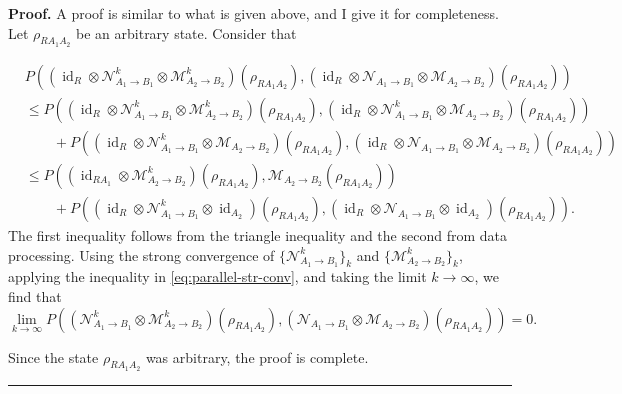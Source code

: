 \documentclass[apsrev,twocolumn]{revtex4-1}%
\newenvironment{proof}[1][Proof]{\noindent\textbf{#1.} }{\ \rule{0.5em}{0.5em}}
\begin{document}
\begin{proof}
A proof is similar to what is given above, and I give it for completeness. Let
$\rho_{RA_{1}A_{2}}$ be an arbitrary state. Consider that\begin{widetext}%
\begin{align}
& \!\!\!\!\!\!\!\! P((\operatorname{id}_{R}\otimes\mathcal{N}_{A_{1}\rightarrow B_{1}}%
^{k}\otimes\mathcal{M}_{A_{2}\rightarrow B_{2}}^{k})(\rho_{RA_{1}A_{2}%
}),(\operatorname{id}_{R}\otimes\mathcal{N}_{A_{1}\rightarrow B_{1}}%
\otimes\mathcal{M}_{A_{2}\rightarrow B_{2}})(\rho_{RA_{1}A_{2}}))\nonumber\\
&  \leq P((\operatorname{id}_{R}\otimes\mathcal{N}_{A_{1}\rightarrow B_{1}%
}^{k}\otimes\mathcal{M}_{A_{2}\rightarrow B_{2}}^{k})(\rho_{RA_{1}A_{2}%
}),(\operatorname{id}_{R}\otimes\mathcal{N}_{A_{1}\rightarrow B_{1}}%
^{k}\otimes\mathcal{M}_{A_{2}\rightarrow B_{2}})(\rho_{RA_{1}A_{2}%
}))\nonumber\\
&  \qquad+P((\operatorname{id}_{R}\otimes\mathcal{N}_{A_{1}\rightarrow B_{1}%
}^{k}\otimes\mathcal{M}_{A_{2}\rightarrow B_{2}})(\rho_{RA_{1}A_{2}%
}),(\operatorname{id}_{R}\otimes\mathcal{N}_{A_{1}\rightarrow B_{1}}%
\otimes\mathcal{M}_{A_{2}\rightarrow B_{2}})(\rho_{RA_{1}A_{2}}))\nonumber\\
&  \leq P((\operatorname{id}_{RA_{1}}\otimes\mathcal{M}_{A_{2}\rightarrow
B_{2}}^{k})(\rho_{RA_{1}A_{2}}),\mathcal{M}_{A_{2}\rightarrow B_{2}}%
(\rho_{RA_{1}A_{2}}))\nonumber\\
&  \qquad+P((\operatorname{id}_{R}\otimes\mathcal{N}_{A_{1}\rightarrow B_{1}%
}^{k}\otimes\operatorname{id}_{A_{2}})(\rho_{RA_{1}A_{2}}),(\operatorname{id}%
_{R}\otimes\mathcal{N}_{A_{1}\rightarrow B_{1}}\otimes\operatorname{id}%
_{A_{2}})(\rho_{RA_{1}A_{2}})).\label{eq:parallel-str-conv}%
\end{align}
The first inequality follows from the triangle inequality and the second from
data processing. Using the strong convergence of $\{\mathcal{N}_{A_{1}%
\rightarrow B_{1}}^{k}\}_{k}$ and $\{\mathcal{M}_{A_{2}\rightarrow B_{2}}%
^{k}\}_{k}$, applying the inequality in \eqref{eq:parallel-str-conv}, and
taking the limit $k\rightarrow\infty$, we find that%
\begin{equation}
\lim_{k\rightarrow\infty}P((\mathcal{N}_{A_{1}\rightarrow B_{1}}^{k}%
\otimes\mathcal{M}_{A_{2}\rightarrow B_{2}}^{k})(\rho_{RA_{1}A_{2}%
}),(\mathcal{N}_{A_{1}\rightarrow B_{1}}\otimes\mathcal{M}_{A_{2}\rightarrow
B_{2}})(\rho_{RA_{1}A_{2}}))=0.
\end{equation}
\end{widetext}Since the state $\rho_{RA_{1}A_{2}}$ was arbitrary, the proof is complete.
\end{proof}
\end{document}
